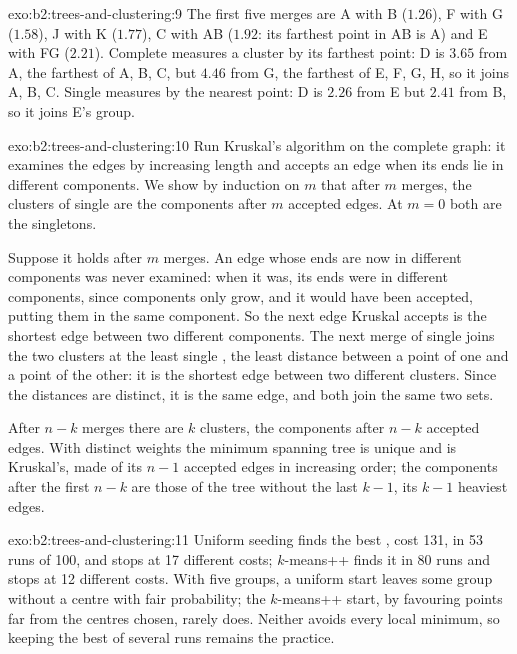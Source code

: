 \begin{solution}{exo:b2:trees-and-clustering:9}
The first five merges are A with B ($1.26$), F with G ($1.58$), J with K ($1.77$), C with AB ($1.92$: its farthest point
in AB is A) and E with FG ($2.21$). Complete  measures a cluster by its farthest point: D is $3.65$ from A, the
farthest of A, B, C, but $4.46$ from G, the farthest of E, F, G, H, so it joins A, B, C. Single  measures by the
nearest point: D is $2.26$ from E but $2.41$ from B, so it joins E's group.
\end{solution}

\begin{solution}{exo:b2:trees-and-clustering:10}
Run Kruskal's algorithm on the complete graph: it examines the edges by increasing length and accepts an edge when its
ends lie in different components. We show by induction on $m$ that after $m$ merges, the clusters of single  are
the components after $m$ accepted edges. At $m = 0$ both are the singletons.

Suppose it holds after $m$ merges. An edge whose ends are now in different components was never examined: when it was,
its ends were in different components, since components only grow, and it would have been accepted, putting them in the
same component. So the next edge Kruskal accepts is the shortest edge between two different components. The next merge of
single  joins the two clusters at the least single , the least distance between a point of one and a
point of the other: it is the shortest edge between two different clusters. Since the distances are distinct, it is
the same edge, and both join the same two sets.

After $n - k$ merges there are $k$ clusters, the components after $n - k$ accepted edges. With distinct weights the
minimum spanning tree is unique and is Kruskal's, made of its $n - 1$ accepted edges in increasing order; the
components after the first $n - k$ are those of the tree without the last $k - 1$, its $k - 1$ heaviest edges.
\end{solution}

\begin{solution}{exo:b2:trees-and-clustering:11}
Uniform seeding finds the best , cost 131, in 53 runs of 100, and stops at 17 different costs; $k$-means++
finds it in 80 runs and stops at 12 different costs. With five groups, a uniform start leaves some group without a centre
with fair probability; the $k$-means++ start, by favouring points far from the centres chosen, rarely does. Neither
avoids every local minimum, so keeping the best of several runs remains the practice.
\end{solution}

